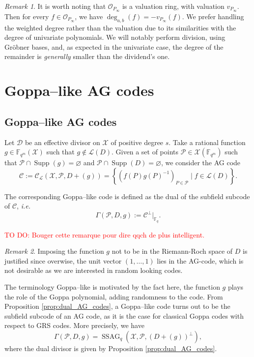 \documentclass[a4paper]{article}
\theoremstyle{definition}
\theoremstyle{remark}
\newtheorem{remark}{Remark}
\newcommand{\calP}{\mathcal{P}}
\newcommand{\calL}{\mathcal{L}}
\newcommand{\calC}{\mathcal{C}}
\newcommand{\calD}{\mathcal{D}}
\newcommand{\calO}{\mathcal{O}}
\newcommand{\calX}{\mathcal{X}}
\newcommand{\fqm}{\mathbb{F}_{q^m}}
\newcommand{\fq}{\mathbb{F}_{q}}
\newcommand{\set}[1]{\left\{#1\right\}}
\newcommand{\Supp}{\operatorname{Supp}}
\newcommand{\ssag}[1]{\operatorname{SSAG}_{q}\left(#1\right)}
\newcommand{\degab}[1]{\deg_{a,b}\left(#1\right)}
\newcommand\TODO[1]{\textcolor{red}{TO DO: #1}}
\begin{document}
\begin{remark}
It is worth noting that $\calO_{P_\infty}$ is a valuation ring, with valuation $v_{P_\infty}$. Then for every $f \in \calO_{P_\infty}$, we have $
\degab{f}=-v_{P_\infty}(f)$. We prefer handling the weighted degree rather than the valuation due to its similarities with the degree of univariate 
polynomials. We will notably perform division, using Gr\"obner bases, and, as expected in the univariate case, the degree of the remainder is 
\textit{generally} smaller than the dividend's one.
\end{remark}



\section{Goppa--like AG codes}


\subsection{Goppa--like AG codes}

Let $\calD$ be an effective divisor on $\calX$ of positive degree $s$. Take a rational function $g \in \fqm(\calX)$ such that $g \notin \calL(D)$. Given a set of points $\calP \in \calX(\fqm)$ such that $\calP \cap \Supp(g) = \varnothing$ and $\calP \cap \Supp(D) = \varnothing$, we consider the AG code
\[\calC := \calC_{\calL}(\calX,\calP,D+(g))=\set{\left(f(P)g(P)^{-1}\right)_{P \in \calP} \mid f \in \calL(D)}.\]

The corresponding Goppa--like code is defined as the dual of the subfield subcode of $\calC$, \emph{i.e.}
$$ \Gamma(\calP,D,g) := \calC^{\perp}|_{\fq}.$$

\TODO{Bouger cette remarque pour dire qqch de plus intelligent.}
\begin{remark} \label{rq:g_notin_L(D)}
	Imposing the function $g$ not to be in the Riemann-Roch space of $D$ is justified since overwise, the unit vector $(1,\dots,1)$ lies in the AG-code, which is not desirable as we are interested in random looking codes. 
\end{remark}


The terminology Goppa--like is motivated by the fact here, the function $g$ plays the role of the Goppa polynomial, adding randomness to the code. From Proposition \ref{prop:dual_AG_codes}, a Goppa--like code turns out to be the subfield subcode of an AG code, as it is the case for classical Goppa codes with respect to GRS codes. More precisely, we have 
$$ \Gamma(\calP,D,g) = \ssag{\calX,\calP,(D+(g))^{\perp}},$$
where the dual divisor is given by Proposition \ref{prop:dual_AG_codes}. 
\end{document}
